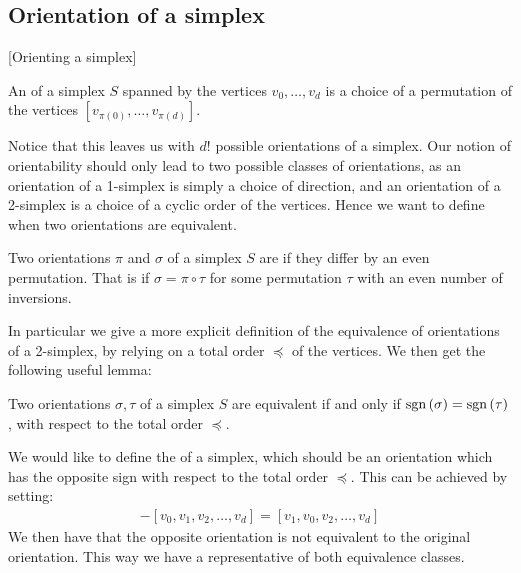 \subsection{Orientation of a simplex}[Orienting a simplex]

\begin{definition}
    An  of a simplex $S$ spanned by the vertices $v_0, \dots, v_d$ is a choice of a permutation of the vertices $[v_{\pi(0)}, \dots, v_{\pi(d)}]$.
\end{definition}

Notice that this leaves us with $d!$ possible orientations of a simplex. Our notion of orientability should only lead to two possible classes of orientations, as an orientation of a 1-simplex is simply a choice of direction, and an orientation of a 2-simplex is a choice of a cyclic order of the vertices. Hence we want to define when two orientations are equivalent.

\begin{definition}
    Two orientations $\pi$ and $\sigma$ of a simplex $S$ are  if they differ by an even permutation. That is if $\sigma = \pi \circ \tau$ for some permutation $\tau$ with an even number of inversions.
\end{definition}

In particular we give a more explicit definition of the equivalence of orientations of a 2-simplex, by relying on a total order $\preceq$ of the vertices. We then get the following useful lemma:

\begin{lemma}
    Two orientations $\sigma, \tau$ of a simplex $S$ are equivalent if and only if $\operatorname{sgn}\left(\sigma\right) = \operatorname{sgn}\left(\tau\right)$, with respect to the total order $\preceq$.
\end{lemma}

We would like to define the  of a simplex, which should be an orientation which has the opposite sign with respect to the total order $\preceq$. This can be achieved by setting:
\begin{align*}
    - [v_0, v_1, v_2, \dots, v_d] = [v_1, v_0, v_2, \dots, v_d]
\end{align*}
We then have that the opposite orientation is not equivalent to the original orientation. This way we have a representative of both equivalence classes.

